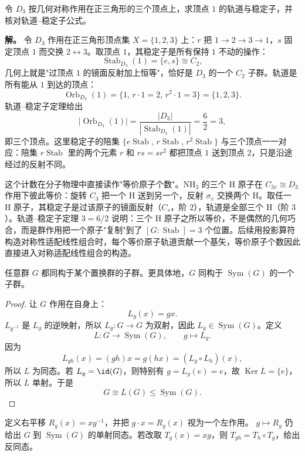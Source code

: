 \begin{example}
\label{ex:d3-action-triangle-vertices}
令 $D_3$ 按几何对称作用在正三角形的三个顶点上，求顶点 $1$ 的轨道与稳定子，并核对轨道--稳定子公式。

\textbf{解。} 令 $D_3$ 作用在正三角形顶点集 $X=\{1,2,3\}$ 上：$r$ 把 $1\to2\to3\to1$，$s$ 固定顶点 $1$ 而交换 $2\leftrightarrow3$。取顶点 $1$，其稳定子是所有保持 $1$ 不动的操作：
\[
\operatorname{Stab}_{D_3}(1)=\{e,s\}\cong C_2,
\]
几何上就是"过顶点 $1$ 的镜面反射加上恒等"，恰好是 $D_3$ 的一个 $C_2$ 子群。轨道是所有能从 $1$ 到达的顶点：
\[
\operatorname{Orb}_{D_3}(1)=\{1,\,r\cdot1=2,\,r^2\cdot1=3\}=\{1,2,3\}.
\]
轨道--稳定子定理给出
\[
\lvert\operatorname{Orb}_{D_3}(1)\rvert=\frac{|D_3|}{|\operatorname{Stab}_{D_3}(1)|}=\frac{6}{2}=3,
\]
即三个顶点。这里稳定子的陪集 $\{e\operatorname{Stab},\,r\operatorname{Stab},\,r^2\operatorname{Stab}\}$ 与三个顶点一一对应：陪集 $r\operatorname{Stab}$ 里的两个元素 $r$ 和 $rs=sr^2$ 都把顶点 $1$ 送到顶点 $2$，只是沿途经过的反射不同。

这个计数在分子物理中直接读作"等价原子个数"。$\mathrm{NH_3}$ 的三个 H 原子在 $C_{3v}\cong D_3$ 作用下彼此等价：旋转 $C_3$ 把一个 H 送到另一个，反射 $\sigma_v$ 交换两个 H。取任一 H 原子，其稳定子是过该原子的镜面反射（$C_s$，阶 $2$），轨道是全部三个 H（阶 $3$）。轨道--稳定子定理 $3=6/2$ 说明：三个 H 原子之所以等价，不是偶然的几何巧合，而是群作用把一个原子"复制"到了 $[G:\operatorname{Stab}]=3$ 个位置。后续用投影算符构造对称性适配线性组合时，每个等价原子轨道贡献一个基矢，等价原子个数因此直接进入对称适配线性组合的构造。
\end{example}

\begin{theorem}[Cayley 定理]
任意群 $G$ 都同构于某个置换群的子群。更具体地，$G$ 同构于 $\operatorname{Sym}(G)$ 的一个子群。
\label{thm:cayley}

\end{theorem}

\begin{proof}
让 $G$ 作用在自身上：
\[
L_g(x)=gx.
\]
$L_{g^{-1}}$ 是 $L_g$ 的逆映射，所以 $L_g:G\to G$ 为双射，因此 $L_g\in\operatorname{Sym}(G)$。定义
\[
L:G\to\operatorname{Sym}(G),
\qquad
g\mapsto L_g.
\]
因为
\[
L_{gh}(x)=(gh)x=g(hx)=(L_g\circ L_h)(x),
\]
所以 $L$ 为同态。若 $L_g=\id(G)$，则特别有 $g=L_g(e)=e$，故 $\operatorname{Ker} L=\{e\}$，所以 $L$ 单射。于是
\[
G\cong L(G)\leqslant\operatorname{Sym}(G).
\]
\end{proof}

\begin{proposition}
定义右平移 $R_g(x)=xg^{-1}$，并把 $g\cdot x=R_g(x)$ 视为一个左作用。 $g\mapsto R_g$ 仍给出 $G$ 到 $\operatorname{Sym}(G)$ 的单射同态。若改取 $T_g(x)=xg$，则 $T_{gh}=T_h\circ T_g$，给出反同态。
\end{proposition}

